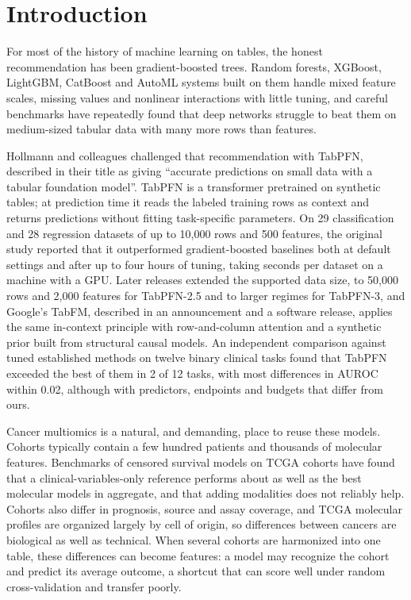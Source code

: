 \documentclass[pdflatex,sn-nature]{sn-jnl}
\begin{document}
\section*{Introduction}

For most of the history of machine learning on tables, the honest recommendation has been gradient-boosted trees. Random forests, XGBoost, LightGBM, CatBoost and AutoML systems built on them handle mixed feature scales, missing values and nonlinear interactions with little tuning, and careful benchmarks have repeatedly found that deep networks struggle to beat them on medium-sized tabular data with many more rows than features.\citep{breiman2001random,chen2016xgboost,ke2017lightgbm,prokhorenkova2018catboost,erickson2020autogluon,grinsztajn2022tree}

Hollmann and colleagues challenged that recommendation with TabPFN, described in their title as giving ``accurate predictions on small data with a tabular foundation model''.\citep{hollmann2025accurate} TabPFN is a transformer pretrained on synthetic tables; at prediction time it reads the labeled training rows as context and returns predictions without fitting task-specific parameters. On 29 classification and 28 regression datasets of up to 10,000 rows and 500 features, the original study reported that it outperformed gradient-boosted baselines both at default settings and after up to four hours of tuning, taking seconds per dataset on a machine with a GPU. Later releases extended the supported data size, to 50,000 rows and 2,000 features for TabPFN-2.5 and to larger regimes for TabPFN-3,\citep{priorlabs2025tabpfn25,priorlabs2026tabpfn3} and Google's TabFM, described in an announcement and a software release, applies the same in-context principle with row-and-column attention and a synthetic prior built from structural causal models.\citep{google2026tabfm,tabfmsoftware2026} An independent comparison against tuned established methods on twelve binary clinical tasks found that TabPFN exceeded the best of them in 2 of 12 tasks, with most differences in AUROC within 0.02, although with predictors, endpoints and budgets that differ from ours.\citep{shaktah2026established}

Cancer multiomics is a natural, and demanding, place to reuse these models. Cohorts typically contain a few hundred patients and thousands of molecular features. Benchmarks of censored survival models on TCGA cohorts have found that a clinical-variables-only reference performs about as well as the best molecular models in aggregate, and that adding modalities does not reliably help.\citep{herrmann2021benchmark,li2024combining,wissel2023systematic} Cohorts also differ in prognosis, source and assay coverage, and TCGA molecular profiles are organized largely by cell of origin,\citep{hoadley2018cell} so differences between cancers are biological as well as technical. When several cohorts are harmonized into one table, these differences can become features: a model may recognize the cohort and predict its average outcome, a shortcut that can score well under random cross-validation and transfer poorly.\citep{soneson2014batch,bernau2014crossstudy,geirhos2020shortcut}
\end{document}
